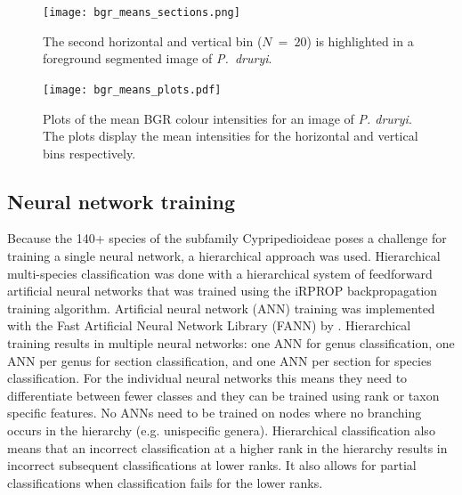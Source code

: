\documentclass[twocolumn]{bmcart}
\begin{document}
\begin{figure}[h]
    \centering
    \texttt{[image: bgr\_means\_sections.png]}
    \caption{The second horizontal and vertical bin ($N~=~20$) is highlighted in a foreground segmented image of \textit{P.~druryi}.}
    \label{fig:bgr-means-sections}
\end{figure}

\begin{figure}[t]
    \centering
    \texttt{[image: bgr\_means\_plots.pdf]}
    \caption{Plots of the mean BGR colour intensities for an image of \textit{P. druryi}. The plots display the mean intensities for the horizontal and vertical bins respectively.}
    \label{fig:bgr-means-plots}
\end{figure}

\subsection{Neural network training}

Because the 140+ species of the subfamily Cypripedioideae poses a challenge for training a single neural network, a hierarchical approach was used. Hierarchical multi-species classification was done with a hierarchical system of feedforward artificial neural networks that was trained using the iRPROP backpropagation training algorithm. Artificial neural network (ANN) training was implemented with the Fast Artificial Neural Network Library (FANN) by \cite{Nissen2003}. Hierarchical training results in multiple neural networks: one ANN for genus classification, one ANN per genus for section classification, and one ANN per section for species classification. For the individual neural networks this means they need to differentiate between fewer classes and they can be trained using rank or taxon specific features. No ANNs need to be trained on nodes where no branching occurs in the hierarchy (e.g. unispecific genera). Hierarchical classification also means that an incorrect classification at a higher rank in the hierarchy results in incorrect subsequent classifications at lower ranks. It also allows for partial classifications when classification fails for the lower ranks.
\end{document}
